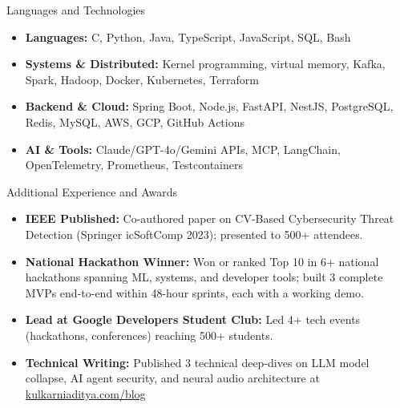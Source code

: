 \documentclass[]{mcdowellcv}
\begin{document}
\begin{cvsection}{Languages and Technologies}
  \begin{cvsubsection}{}{}{}
    \begin{itemize}
      \item \textbf{Languages:} C, Python, Java, TypeScript, JavaScript, SQL, Bash
      \item \textbf{Systems \& Distributed:} Kernel programming, virtual memory, Kafka, Spark, Hadoop, Docker, Kubernetes, Terraform
      \item \textbf{Backend \& Cloud:} Spring Boot, Node.js, FastAPI, NestJS, PostgreSQL, Redis, MySQL, AWS, GCP, GitHub Actions
      \item \textbf{AI \& Tools:} Claude/GPT-4o/Gemini APIs, MCP, LangChain, OpenTelemetry, Prometheus, Testcontainers
    \end{itemize}
  \end{cvsubsection}
\end{cvsection}

\begin{cvsection}{Additional Experience and Awards}
  \begin{cvsubsection}{}{}{}
    \begin{itemize}
      \item \textbf{IEEE Published:} Co-authored paper on CV-Based Cybersecurity Threat Detection (Springer icSoftComp 2023); presented to 500+ attendees.
      \item \textbf{National Hackathon Winner:} Won or ranked Top 10 in 6+ national hackathons spanning ML, systems, and developer tools; built 3 complete MVPs end-to-end within 48-hour sprints, each with a working demo.
      \item \textbf{Lead at Google Developers Student Club:} Led 4+ tech events (hackathons, conferences) reaching 500+ students.
      \item \textbf{Technical Writing:} Published 3 technical deep-dives on LLM model collapse, AI agent security, and neural audio architecture at \href{https://www.kulkarniaditya.com/blog}{kulkarniaditya.com/blog}
    \end{itemize}
  \end{cvsubsection}
\end{cvsection}
\end{document}
